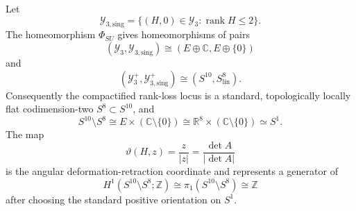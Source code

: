 \begin{theorem}
\label{thm:hr3c-rank-loss-pair}
Let
\begin{equation}
 \mathcal Y_{3,\mathrm{sing}}
 =\{(H,0)\in\mathcal Y_3:\operatorname{rank}H\leq2\}.
 \label{eq:hr3c-singular-invariant-locus}
\end{equation}
The homeomorphism \(\Phi_{SU}\) gives homeomorphisms of pairs
\begin{equation}
 (\mathcal Y_3,\mathcal Y_{3,\mathrm{sing}})
 \cong
 (E\oplus\mathbb C,E\oplus\{0\})
 \label{eq:hr3c-affine-pair}
\end{equation}
and
\begin{equation}
 (\mathcal Y_3^+,\mathcal Y_{3,\mathrm{sing}}^+)
 \cong
 (S^{10},S^8_{\mathrm{lin}}).
 \label{eq:hr3c-compact-pair}
\end{equation}
Consequently the compactified rank-loss locus is a standard,
topologically locally flat codimension-two \(S^8\subset S^{10}\), and
\begin{equation}
 S^{10}\setminus S^8
 \cong
 E\times(\mathbb C\setminus\{0\})
 \cong
 \mathbb R^8\times(\mathbb C\setminus\{0\})
 \simeq S^1.
 \label{eq:hr3c-complement}
\end{equation}
The map
\begin{equation}
 \vartheta(H,z)=\frac{z}{|z|}
 =\frac{\det A}{|\det A|}
 \label{eq:hr3c-phase-map}
\end{equation}
is the angular deformation-retraction coordinate and represents a
generator of
\[
 H^1(S^{10}\setminus S^8;\mathbb Z)
 \cong
 \pi_1(S^{10}\setminus S^8)
 \cong\mathbb Z
\]
after choosing the standard positive orientation on \(S^1\).
\end{theorem}

